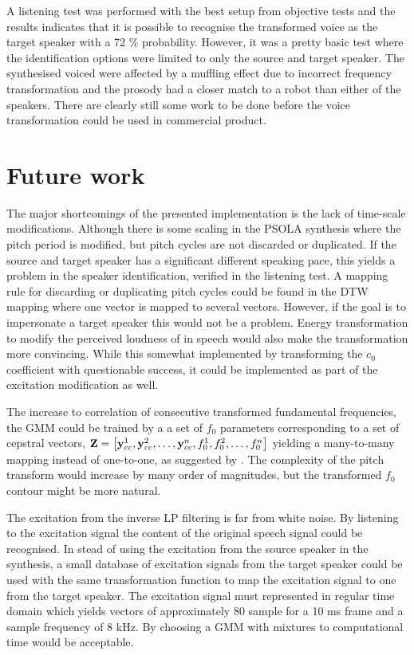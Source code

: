 A listening test was performed with the best setup from objective tests and the results indicates that it is possible to recognise the transformed voice as the target speaker with a 72 \% probability. However, it was a pretty basic test where the identification options were limited to only the source and target speaker. The synthesised voiced were affected by a muffling effect due to incorrect frequency transformation and the prosody had a closer match to a robot than either of the speakers. There are clearly still some work to be done before the voice transformation could be used in commercial product.


\section{Future work} %
\label{sec:future_work}

The major shortcomings of the presented implementation is the lack of time-scale modifications. Although there is some scaling in the PSOLA synthesis where the pitch period is modified, but pitch cycles are not discarded or duplicated. If the source and target speaker has a significant different speaking pace, this yields a problem in the speaker identification, verified in the listening test. A mapping rule for discarding or duplicating pitch cycles could be found in the DTW mapping where one vector is mapped to several vectors. However, if the goal is to impersonate a target speaker this would not be a problem. Energy transformation to modify the perceived loudness of in speech would also make the transformation more convincing. While this somewhat implemented by transforming the $c_0$ coefficient with questionable success, it could be implemented as part of the excitation modification as well. 

The increase to correlation of consecutive transformed fundamental frequencies, the GMM could be trained by a a set of $f_0$ parameters corresponding to a set of cepstral vectors, $\mathbf{Z}=\left[\mathbf{y}_{cc}^1,\mathbf{y}_{cc}^2,\dotsc,\mathbf{y}_{cc}^n,f_{0}^1,f_{0}^2,\dotsc,f_{0}^n\right]$ yielding a many-to-many mapping instead of one-to-one, as suggested by \cite{najjary04}. The complexity of the pitch transform would increase by many order of magnitudes, but the transformed $f_0$ contour might be more natural.

The excitation from the inverse LP filtering is far from white noise. By listening to the excitation signal the content of the original speech signal could be recognised. In stead of using the excitation from the source speaker in the synthesis, a small database of excitation signals from the target speaker could be used with the same transformation function to map the excitation signal to one from the target speaker. The excitation signal must represented in regular time domain which yields vectors of approximately 80 sample for a 10 ms frame and a sample frequency of 8 kHz. By choosing a GMM with  mixtures to computational time would be acceptable.

